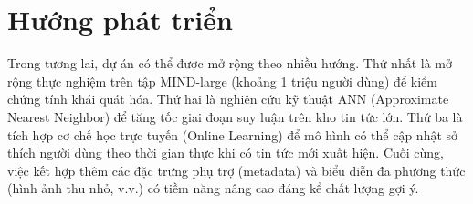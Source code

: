 \documentclass[../BTL.tex]{subfiles}
\begin{document}
\section{Hướng phát triển}

Trong tương lai, dự án có thể được mở rộng theo nhiều hướng. Thứ nhất là mở rộng thực nghiệm trên tập MIND-large (khoảng 1 triệu người dùng) để kiểm chứng tính khái quát hóa. Thứ hai là nghiên cứu kỹ thuật ANN (Approximate Nearest Neighbor) để tăng tốc giai đoạn suy luận trên kho tin tức lớn. Thứ ba là tích hợp cơ chế học trực tuyến (Online Learning) để mô hình có thể cập nhật sở thích người dùng theo thời gian thực khi có tin tức mới xuất hiện. Cuối cùng, việc kết hợp thêm các đặc trưng phụ trợ (metadata) và biểu diễn đa phương thức (hình ảnh thu nhỏ, v.v.) có tiềm năng nâng cao đáng kể chất lượng gợi ý.
\end{document}
